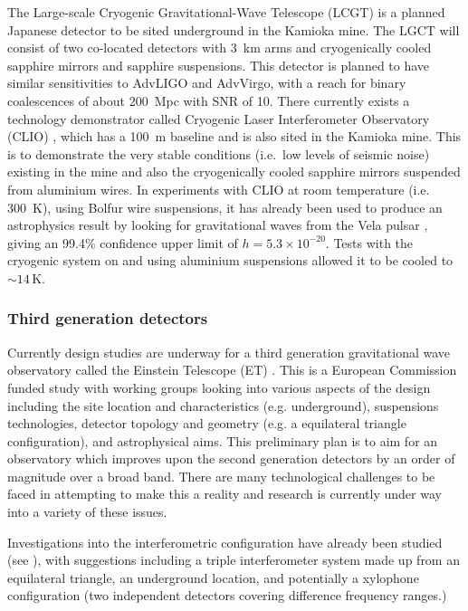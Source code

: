 \documentclass{article}
\begin{document}
The Large-scale Cryogenic Gravitational-Wave Telescope (LCGT)
\cite{Miyoki:2005, Ohashi:2008} is a planned Japanese detector to be sited
underground in the Kamioka mine. The LGCT will consist of two co-located
detectors with 3~km arms and cryogenically cooled sapphire mirrors and sapphire
suspensions. This detector is planned to have similar sensitivities to AdvLIGO
and AdvVirgo, with a reach for binary coalescences of about 200~Mpc with SNR of
10. There currently exists a technology demonstrator called Cryogenic Laser
Interferometer Observatory (CLIO) \cite{Yamamoto:2008, CLIOweb}, which has a
100~m baseline and is also sited in the Kamioka mine. This is to demonstrate the
very stable conditions (i.e.\ low levels of seismic noise) existing in the mine
and also the cryogenically cooled sapphire mirrors suspended from aluminium
wires. In experiments with CLIO at room temperature (i.e. 300~K), using Bolfur
wire suspensions, it has already been used to produce an astrophysics result by
looking for gravitational waves from the Vela pulsar \cite{Akutsu:2008}, giving
an 99.4\% confidence upper limit of $h = 5.3\times10^{-20}$. Tests with the
cryogenic system on and using aluminium suspensions allowed it to be cooled to
$\sim14$\,K.

\subsubsection{Third generation detectors}
Currently design studies are underway for a third generation gravitational wave
observatory called the Einstein Telescope (ET) \cite{ETweb}. This is a European
Commission funded study with working groups looking into various aspects of the
design including the site location and characteristics (e.g. underground),
suspensions technologies, detector topology and geometry (e.g. a equilateral
triangle configuration), and astrophysical aims. This preliminary plan is to
aim for an observatory which improves upon the second generation detectors by
an order of magnitude over a broad band. There are many technological
challenges to be faced in attempting to make this a reality and research is
currently under way into a variety of these issues.

Investigations into the interferometric configuration have already been studied
(see \cite{Freise:2008, Hild:2008}), with suggestions including a triple
interferometer system made up from an equilateral triangle, an underground
location, and potentially a xylophone configuration (two independent detectors
covering difference frequency ranges.)
\end{document}
